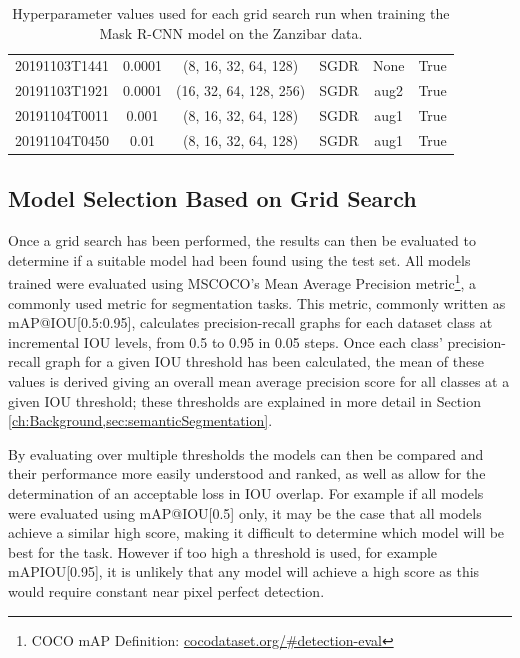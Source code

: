 \begin{table}[!ht]
\begin{adjustbox}{width=\columnwidth, center}
\begin{tabular}{cccccc}
			20191103T1441 &       0.0001 &     (8, 16, 32, 64, 128) &      SGDR &                  None &                  True \\
			20191103T1921 &       0.0001 &   (16, 32, 64, 128, 256) &      SGDR &                  aug2 &                  True \\
			20191104T0011 &        0.001 &     (8, 16, 32, 64, 128) &      SGDR &                  aug1 &                  True \\
			20191104T0450 &         0.01 &     (8, 16, 32, 64, 128) &      SGDR &                  aug1 &                  True \\
			\bottomrule
		\end{tabular}
	\end{adjustbox}
	\caption{Hyperparameter values used for each grid search run when training the Mask R-CNN model on the Zanzibar data.}\label{tab:MaskRCNNHyperparamTuningGridSearch}
\end{table}

\subsection{Model Selection Based on Grid Search}\label{ch:cetDet,sec:ModelSelection,sub:ModelSelectionBasedOnGridSearch}

Once a grid search has been performed, the results can then be evaluated to determine if a suitable model had been found using the test set. All models trained were evaluated using MSCOCO's Mean Average Precision metric\footnote{COCO mAP Definition: \href{https://cocodataset.org/\#detection-eval}{cocodataset.org/\#detection-eval}}, a commonly used metric for segmentation tasks. This metric, commonly written as mAP@IOU[0.5:0.95], calculates precision-recall graphs for each dataset class at incremental IOU levels, from 0.5 to 0.95 in 0.05 steps. Once each class' precision-recall graph for a given IOU threshold has been calculated, the mean of these values is derived giving an overall mean average precision score for all classes at a given IOU threshold; these thresholds are explained in more detail in Section \ref{ch:Background,sec:semanticSegmentation}.

By evaluating over multiple thresholds the models can then be compared and their performance more easily understood and ranked, as well as allow for the determination of an acceptable loss in IOU overlap. For example if all models were evaluated using mAP@IOU[0.5] only, it may be the case that all models achieve a similar high score, making it difficult to determine which model will be best for the task. However if too high a threshold is used, for example mAPIOU[0.95], it is unlikely that any model will achieve a high score as this would require constant near pixel perfect detection. 

